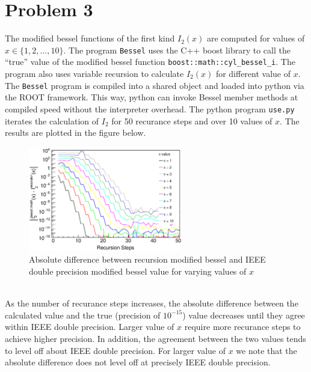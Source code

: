 \documentclass[singlepage,notitlepage,nofootinbib,12pt]{revtex4-1}
\begin{document}
\section{Problem 3}
The modified bessel functions of the first kind $I_2(x)$ are computed for values of $x\in\{1,2,\dots,10\}$. The program \verb|Bessel| uses the C++ boost library to call the ``true'' value of the modified bessel function \verb|boost::math::cyl_bessel_i|. The program also uses variable recursion to calculate $I_2(x)$ for different value of $x$. The \verb|Bessel| program is compiled into a shared object and loaded into python via the ROOT framework. This way, python can invoke Bessel member methods at compiled speed without the interpreter overhead. The python program \verb|use.py| iterates the calculation of $I_2$ for 50 recurance steps and over 10 values of $x$. The results are plotted in the figure below. 
\begin{figure}[h]
\centering
\includegraphics[width=0.6\textwidth]{figures/modified_bessel.eps}
\caption{Absolute difference between recursion modified bessel and IEEE double precision modified bessel value for varying values of $x$}
\end{figure}\\
\indent As the number of recurance steps increases, the absolute difference between the calculated value and the true (precision of $10^{-15}$) value decreases until they agree within IEEE double precision. Larger value of $x$ require more recurance steps to achieve higher precision. In addition, the agreement between the two values tends to level off about IEEE double precision. For larger value of $x$ we note that the absolute difference does not level off at precisely IEEE double precision.
\end{document}
